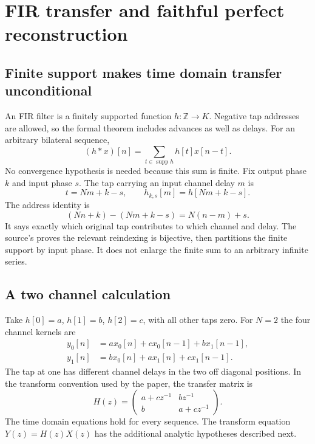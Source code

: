 \section{FIR transfer and faithful perfect reconstruction}
\subsection{Finite support makes time domain transfer unconditional}
An FIR filter is a finitely supported function $h:\mathbb Z\to K$. Negative tap addresses are allowed, so the formal theorem includes advances as well as delays. For an arbitrary bilateral sequence,
\[
(h*x)[n]=\sum_{t\in\operatorname{supp}h}h[t]x[n-t].
\]
No convergence hypothesis is needed because this sum is finite.
Fix output phase $k$ and input phase $s$. The tap carrying an input channel delay $m$ is
\[
t=Nm+k-s,\qquad h_{k,s}[m]=h[Nm+k-s].
\]
The address identity is
\[
(Nn+k)-(Nm+k-s)=N(n-m)+s.
\]
It says exactly which original tap contributes to which channel and delay. The source's  proves the relevant reindexing is bijective, then partitions the finite support by input phase. It does not enlarge the finite sum to an arbitrary infinite series.

\subsection{A two channel calculation}
\begin{microexample}[title={Three taps and their channel delays}]
Take $h[0]=a$, $h[1]=b$, $h[2]=c$, with all other taps zero. For $N=2$ the four channel kernels are
\[
\begin{aligned}
y_0[n]&=a x_0[n]+c x_0[n-1]+b x_1[n-1],\\
y_1[n]&=b x_0[n]+a x_1[n]+c x_1[n-1].
\end{aligned}
\]
The tap at one has different channel delays in the two off diagonal positions. In the transform convention used by the paper, the transfer matrix is
\[
H(z)=\begin{pmatrix}a+c z^{-1}&b z^{-1}\\b&a+c z^{-1}\end{pmatrix}.
\]
The time domain equations hold for every sequence. The transform equation $Y(z)=H(z)X(z)$ has the additional analytic hypotheses described next.

\end{microexample}

